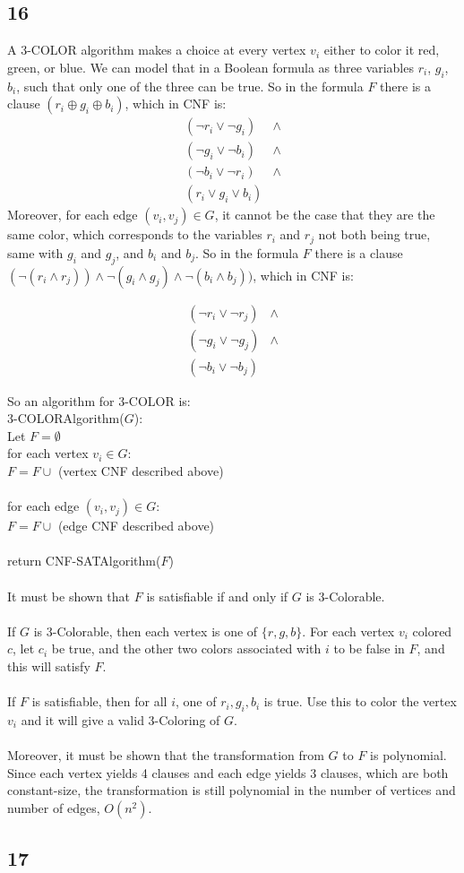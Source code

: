\documentclass[letterpaper,notitlepage,twoside]{article}
\newcommand{\union}{\cup}
\newcommand\tab[1][1cm]{\hspace*{#1}} %
\begin{document}
\subsection*{16}
A 3-COLOR algorithm makes a choice at every vertex $v_i$ either to color it red, green, or blue. We can model that in a Boolean formula as three variables $r_i$, $g_i$, $b_i$, such that only one of the three can be true. So in the formula $F$ there is a clause $(r_i \oplus g_i \oplus b_i)$, which in CNF is:
\begin{align*}
(\neg r_i \lor \neg g_i) &\land \\
(\neg g_i \lor \neg b_i) &\land \\
(\neg b_i \lor \neg r_i) &\land \\
(r_i \lor g_i \lor b_i) 
\end{align*}
Moreover, for each edge $(v_i, v_j) \in G$, it cannot be the case that they are the same color, which corresponds to the variables $r_i$ and $r_j$ not both being true, same with $g_i$ and $g_j$, and $b_i$ and $b_j$. So in the formula $F$ there is a clause $(\neg (r_i \land r_j)) \land \neg (g_i \land g_j) \land \neg (b_i \land b_j))$, which in CNF is:

\begin{align*}
(\neg r_i \lor \neg r_j) &\land \\
(\neg g_i \lor \neg g_j) &\land \\
(\neg b_i \lor \neg b_j)
\end{align*}

So an algorithm for 3-COLOR is:\\
3-COLORAlgorithm($G$):\\
\tab Let $F = \emptyset$ \\
\tab for each vertex $v_i \in G$: \\
\tab\tab $F = F \union$ (vertex CNF described above)
\\\\
\tab for each edge $(v_i, v_j) \in G$: \\
\tab\tab $F = F \union$ (edge CNF described above)
\\\\
\tab return CNF-SATAlgorithm($F$)
\\\\

It must be shown that $F$ is satisfiable if and only if $G$ is 3-Colorable.
\\\\
If $G$ is 3-Colorable, then each vertex is one of $\{r, g, b\}$. For each vertex $v_i$ colored $c$, let $c_i$ be true, and the other two colors associated with $i$ to be false in $F$, and this will satisfy $F$.
\\\\
If $F$ is satisfiable, then for all $i$, one of $r_i, g_i, b_i$ is true. Use this to color the vertex $v_i$ and it will give a valid 3-Coloring of $G$.
\\\\
Moreover, it must be shown that the transformation from $G$ to $F$ is polynomial. Since each vertex yields 4 clauses and each edge yields 3 clauses, which are both constant-size, the transformation is still polynomial in the number of vertices and number of edges, $O(n^2)$.
\subsection*{17}
\end{document}
